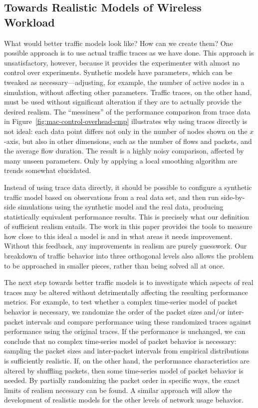 \documentclass[conference]{IEEEtran}
\begin{document}
\subsection{Towards Realistic Models of Wireless Workload}

What would better traffic models look like? How can we create them? One possible approach is to use actual traffic traces as we have done. This approach is unsatisfactory, however, because it provides the experimenter with almost no control over experiments. Synthetic models have parameters, which can be tweaked as necessary---adjusting, for example, the number of active nodes in a simulation, without affecting other parameters. Traffic traces, on the other hand, must be used without significant alteration if they are to actually provide the desired realism. The ``messiness'' of the performance comparison from trace data in Figure~\ref{fig:mac-control-overhead-cmp} illustrates why using traces directly is not ideal: each data point differs not only in the number of nodes shown on the $x$-axis, but also in other dimensions, such as the number of flows and packets, and the average flow duration. The result is a highly noisy comparison, affected by many unseen parameters. Only by applying a local smoothing algorithm are trends somewhat elucidated.

Instead of using trace data directly, it should be possible to configure a synthetic traffic model based on observations from a real data set, and then run side-by-side simulations using the synthetic model and the real data, producing statistically equivalent performance results. This is precisely what our definition of sufficient realism entails. The work in this paper provides the tools to measure how close to this ideal a model is and in what areas it needs improvement. Without this feedback, any improvements in realism are purely guesswork. Our breakdown of traffic behavior into three orthogonal levels also allows the problem to be approached in smaller pieces, rather than being solved all at once.

The next step towards better traffic models is to investigate which aspects of real traces may be altered without detrimentally affecting the resulting performance metrics. For example, to test whether a complex time-series model of packet behavior is necessary, we randomize the order of the packet sizes and/or inter-packet intervals and compare performance using these randomized traces against performance using the original traces. If the performance is unchanged, we can conclude that no complex time-series model of packet behavior is necessary: sampling the packet sizes and inter-packet intervals from empirical distributions is sufficiently realistic. If, on the other hand, the performance characteristics are altered by shuffling packets, then some time-series model of packet behavior is needed. By partially randomizing the packet order in specific ways, the exact limits of realism necessary can be found. A similar approach will allow the development of realistic models for the other levels of network usage behavior.
\end{document}
